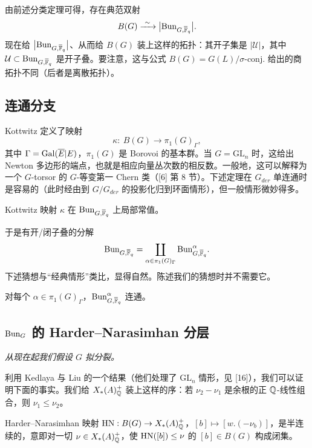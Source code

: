 由前述分类定理可得，存在典范双射
\[
B(G)\xrightarrow{\ \sim\ }\bigl|\Bun_{G,\ol{\FF}_q}\bigr|.
\]
现在给 $\bigl|\mathrm{Bun}_{G,\overline{\mathbb{F}}_q}\bigr|$、从而给 $B(G)$ 装上这样的拓扑：其开子集是 $|\mathcal{U}|$，其中 $\mathcal{U}\subset\mathrm{Bun}_{G,\overline{\mathbb{F}}_q}$ 是开子叠。要注意，这与公式 $B(G)=G(L)/\sigma\text{-conj.}$ 给出的商拓扑不同（后者是离散拓扑）。


\subsection{连通分支}%

Kottwitz 定义了映射
\[
\kappa:\ B(G)\longrightarrow \pi_1(G)_\Gamma,
\]
其中 $\Gamma=\operatorname{Gal}(\overline{E}|E)$，$\pi_1(G)$ 是 Borovoi 的基本群。当 $G=\mathrm{GL}_n$ 时，这给出 Newton 多边形的端点，也就是相应向量丛次数的相反数。一般地，这可以解释为一个 $G$-torsor 的 $G$-等变第一 Chern 类（[6] 第 8 节）。下述定理在 $G_{der}$ 单连通时是容易的（此时经由到 $G/G_{der}$ 的投影化归到环面情形），但一般情形微妙得多。

\begin{theorem}\label{thm:2.15}
Kottwitz 映射 $\kappa$ 在 $\mathrm{Bun}_{G,\overline{\mathbb{F}}_q}$ 上局部常值。
\end{theorem}

于是有开/闭子叠的分解
\[
\mathrm{Bun}_{G,\overline{\mathbb{F}}_q}=\coprod_{\alpha\in\pi_1(G)_\Gamma}\mathrm{Bun}^{\alpha}_{G,\overline{\mathbb{F}}_q}.
\]
下述猜想与“经典情形”类比，显得自然。陈述我们的猜想时并不需要它。

\begin{conjecture}\label{conj:2.16}
对每个 $\alpha\in\pi_1(G)_\Gamma$，$\mathrm{Bun}^{\alpha}_{G,\overline{\mathbb{F}}_q}$ 连通。
\end{conjecture}

\subsection{\texorpdfstring{$\mathrm{Bun}_G$}{Bun\_G} 的 Harder–Narasimhan 分层}%

\emph{从现在起我们假设 $G$ 拟分裂。}

利用 Kedlaya 与 Liu 的一个结果（他们处理了 $\mathrm{GL}_n$ 情形，见 [16]），我们可以证明下面的事实。我们给 $X_*(A)^+_{\mathbb{Q}}$ 装上这样的序：若 $\nu_2-\nu_1$ 是余根的正 $\mathbb{Q}$-线性组合，则 $\nu_1\le\nu_2$。

\begin{theorem}\label{thm:2.17}
Harder–Narasimhan 映射 $\operatorname{HN}:B(G)\to X_*(A)^+_{\mathbb{Q}}$，$[b]\mapsto[w.(-\nu_b)]$，是半连续的，意即对一切 $\nu\in X_*(A)^+_{\mathbb{Q}}$，使 $\operatorname{HN}([b])\le\nu$ 的 $[b]\in B(G)$ 构成闭集。
\end{theorem}

